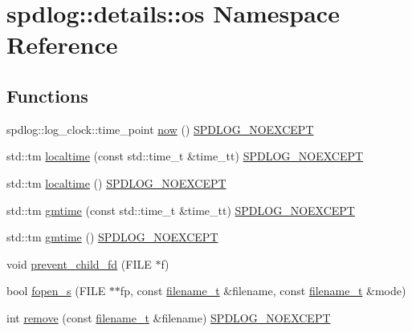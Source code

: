 \hypertarget{namespacespdlog_1_1details_1_1os}{}\section{spdlog\+:\+:details\+:\+:os Namespace Reference}
\label{namespacespdlog_1_1details_1_1os}
\subsection*{Functions}
\begin{DoxyCompactItemize}
\item 
spdlog\+::log\+\_\+clock\+::time\+\_\+point \hyperlink{namespacespdlog_1_1details_1_1os_ab86a7d9f1495a0edae71ce647bae6a66}{now} () \hyperlink{common_8h_a15d2dc432e6bb83beb5130be9a4ca8d6}{S\+P\+D\+L\+O\+G\+\_\+\+N\+O\+E\+X\+C\+E\+PT}
\item 
std\+::tm \hyperlink{namespacespdlog_1_1details_1_1os_aef63b92ee93ec66603c0357d0ac75bed}{localtime} (const std\+::time\+\_\+t \&time\+\_\+tt) \hyperlink{common_8h_a15d2dc432e6bb83beb5130be9a4ca8d6}{S\+P\+D\+L\+O\+G\+\_\+\+N\+O\+E\+X\+C\+E\+PT}
\item 
std\+::tm \hyperlink{namespacespdlog_1_1details_1_1os_a3c7704d0c74aed204f258ac1fc7d4576}{localtime} () \hyperlink{common_8h_a15d2dc432e6bb83beb5130be9a4ca8d6}{S\+P\+D\+L\+O\+G\+\_\+\+N\+O\+E\+X\+C\+E\+PT}
\item 
std\+::tm \hyperlink{namespacespdlog_1_1details_1_1os_ac993ad051e07cd5bda5328be2a54b0a8}{gmtime} (const std\+::time\+\_\+t \&time\+\_\+tt) \hyperlink{common_8h_a15d2dc432e6bb83beb5130be9a4ca8d6}{S\+P\+D\+L\+O\+G\+\_\+\+N\+O\+E\+X\+C\+E\+PT}
\item 
std\+::tm \hyperlink{namespacespdlog_1_1details_1_1os_a504776f0a18b0090f66778f7ad8add0b}{gmtime} () \hyperlink{common_8h_a15d2dc432e6bb83beb5130be9a4ca8d6}{S\+P\+D\+L\+O\+G\+\_\+\+N\+O\+E\+X\+C\+E\+PT}
\item 
void \hyperlink{namespacespdlog_1_1details_1_1os_a58e68538bb3667c56f3623bf047093d6}{prevent\+\_\+child\+\_\+fd} (F\+I\+LE $\ast$f)
\item 
bool \hyperlink{namespacespdlog_1_1details_1_1os_af2d11a0b892e2f0cb3c6beba4c659a47}{fopen\+\_\+s} (F\+I\+LE $\ast$$\ast$fp, const \hyperlink{namespacespdlog_acf7ce125b3622e44f8f1702d699e0b06}{filename\+\_\+t} \&filename, const \hyperlink{namespacespdlog_acf7ce125b3622e44f8f1702d699e0b06}{filename\+\_\+t} \&mode)
\item 
int \hyperlink{namespacespdlog_1_1details_1_1os_a08477012dc14c38d86657b40edd2f534}{remove} (const \hyperlink{namespacespdlog_acf7ce125b3622e44f8f1702d699e0b06}{filename\+\_\+t} \&filename) \hyperlink{common_8h_a15d2dc432e6bb83beb5130be9a4ca8d6}{S\+P\+D\+L\+O\+G\+\_\+\+N\+O\+E\+X\+C\+E\+PT}
$$
\end{DoxyCompactItemize}

